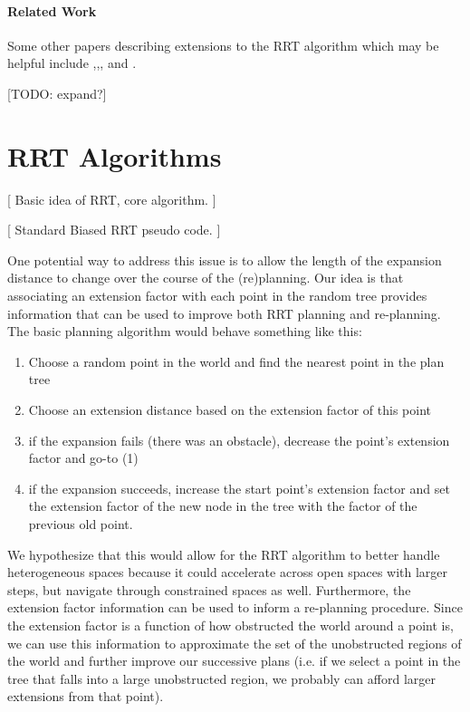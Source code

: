 \documentclass[10pt,twoside,twocolumn]{article}
\begin{document}
\paragraph{Related Work}

Some other papers describing extensions to the RRT algorithm which may be helpful include \cite{Lavalle98rapidly-exploringrandom},\cite{Lindemann04incrementallyreducing},\cite{Jaillet05adaptivetuning}, and \cite{moplan2009}.

[TODO: expand?]

\section{RRT Algorithms}

[ Basic idea of RRT, core algorithm. ]

[ Standard Biased RRT pseudo code. ]

One potential way to address this issue is to allow the length of the expansion distance to change over the course of the (re)planning. 
Our idea is that associating an extension factor with each point in the random tree provides information that can be used to
improve both RRT planning and re-planning. 
The basic planning algorithm would behave something like this:
\begin{enumerate}
\item Choose a random point in the world and find the nearest point in the plan tree
\item Choose an extension distance based on the extension factor of this point
\item if the expansion fails (there was an obstacle), decrease the point's extension factor and go-to (1)
\item if the expansion succeeds, increase the start point's extension factor and set the extension factor of the new node in the tree with the factor of the previous old point.
\end{enumerate}
We hypothesize that this would allow for the RRT algorithm to better handle heterogeneous spaces because it could accelerate across open spaces with larger steps, but navigate through constrained spaces as well. Furthermore, the extension factor information can be used to inform a re-planning procedure. Since the extension factor is a function of how obstructed the world
around a point is, we can use this information to approximate the set of the unobstructed regions of the world and further improve
our successive plans (i.e. if we select a point in the tree that falls into a large unobstructed region, we probably can afford larger extensions from that point).
\end{document}
